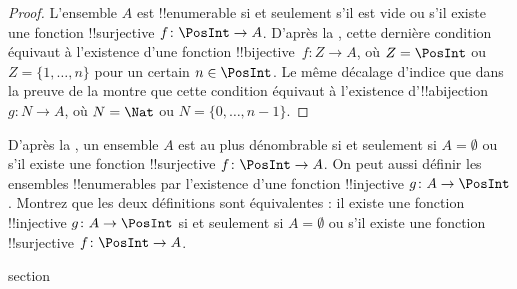 \documentclass[11pt,a4paper,openany]{memoir}
\begin{document}
\begin{proof}
L’ensemble $A$ est !!{enumerable} si et seulement s’il est vide
ou s’il existe une fonction !!{surjective} $f\colon \PosInt \to A$.
D’après la , cette dernière condition équivaut
à l’existence d’une fonction !!{bijective}~$f\colon Z \to A$, où
$Z = \PosInt$ ou $Z = \{1, \dots, n\}$ pour un certain $n \in \PosInt$.
Le même décalage d’indice que dans la preuve de la 
montre que cette condition équivaut à l’existence d’!!a{bijection}
$g\colon N \to A$, où $N = \Nat$ ou $N = \{0, \dots, n-1\}$.
\end{proof}

\begin{prob}
D’après la , un ensemble $A$
est au plus dénombrable si et seulement si $A = \emptyset$ ou s’il
existe une fonction !!{surjective} $f\colon \PosInt \to A$.
On peut aussi définir les ensembles !!{enumerable}s par l’existence
d’une fonction !!{injective} $g\colon A \to \PosInt$. Montrez que
les deux définitions sont équivalentes : il existe une fonction
!!{injective} $g\colon A \to \PosInt$ si et seulement si $A = \emptyset$
ou s’il existe une fonction !!{surjective} $f\colon \PosInt \to A$.
\end{prob}


\endgroup



\begingroup
\expandafter\def\csname ol@sectioncs\endcsname{section}
\def\olfilename{zig-zag}



\end{document}
